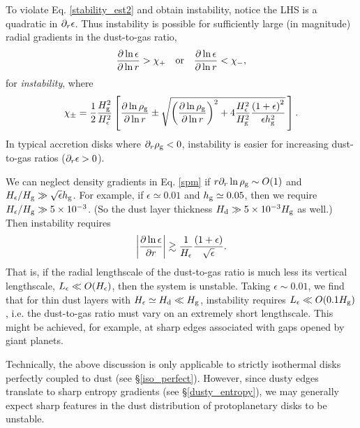 
To violate Eq. \ref{stability_est2} and obtain instability, notice the 
LHS is a quadratic in $\partial_r\epsilon$. Thus instability is possible for
sufficiently large (in magnitude) radial gradients  in the dust-to-gas
ratio,  
\begin{align}
  \frac{\partial\ln{\epsilon}}{\partial\ln{r}} > \chi_+ \quad \mathrm{or} \quad 
  \frac{\partial\ln{\epsilon}}{\partial\ln{r}} < \chi_-,
\end{align}
for \emph{instability}, where
\begin{align}\label{spm}
\chi_\pm = \frac{1}{2}\frac{H_\mathrm{g}^2}{H_\epsilon^2} 
  \left[
  \frac{\partial\ln{\rho_\mathrm{g}}}{\partial\ln{r}} \pm 
  \sqrt{
  \left(\frac{\partial\ln{\rho_\mathrm{g}}}{\partial\ln{r}}\right)^2 + 
  4 \frac{H_\epsilon^2}{H_\mathrm{g}^2}
  \frac{\left(1+\epsilon\right)^2}{\epsilon h_\mathrm{g}^2}
  }
  \,\right]. 
\end{align} 
In typical accretion disks where $\partial_r\rho_\mathrm{g}<0$, instability is easier
for increasing dust-to-gas ratios ($\partial_r\epsilon > 0$).  

We can neglect density gradients in Eq. \ref{spm} 
if $r\partial_r\ln{\rho_\mathrm{g}}\sim O(1)$ and $H_\epsilon/H_\mathrm{g}\gg
\sqrt{\epsilon}h_\mathrm{g}$. For example, if $\epsilon\simeq 0.01$ and
$h_\mathrm{g}\simeq 0.05$, then we require $H_\epsilon/H_\mathrm{g}\gg
5\times10^{-3}$. (So the dust layer thickness $H_\mathrm{d}\gg 5
\times10^{-3}H_\mathrm{g}$ as well.) Then 
instability requires 
\begin{align}\label{dust_edge}
\left|\frac{\partial\ln{\epsilon}}{\partial r}\right| \gtrsim
  \frac{1}{H_\epsilon}\frac{\left(1+\epsilon\right)}{\sqrt{\epsilon}}.
\end{align}
That is, if the radial lengthscale of the dust-to-gas ratio 
is much less its vertical lengthscale, $L_\epsilon\ll O(H_\epsilon)$, 
then the system is  unstable.  
Taking $\epsilon\sim 0.01$,  we find that 
for thin dust layers with $H_\epsilon \simeq H_\mathrm{d}\ll H_\mathrm{g}$,  instability
requires $L_\epsilon\ll O(0.1H_\mathrm{g})$, i.e. the dust-to-gas ratio must 
vary on an extremely short lengthscale. This might be achieved, for
example, at sharp edges associated with gaps opened by giant planets. 

Technically, the above discussion is only applicable to strictly
isothermal disks perfectly coupled to dust (see \S\ref{iso_perfect}). 
However, since dusty edges translate to sharp entropy gradients (see
\S\ref{dusty_entropy}), we may generally expect sharp features in the
dust distribution of protoplanetary disks to be unstable.  



